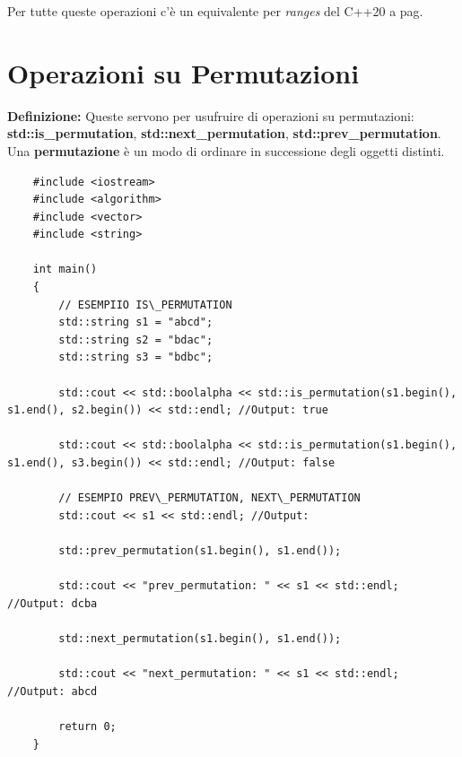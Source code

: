 
\fleuron

\textsf{\small Per tutte queste operazioni c'è un equivalente per \emph{ranges} del C++20 a pag. \pageref{ranges}} \\


\newpage

\section{Operazioni su Permutazioni}

\textsf{\small \textbf{Definizione: } Queste servono per usufruire di operazioni su permutazioni: \textbf{std::is\_permutation}, \textbf{std::next\_permutation}, \textbf{std::prev\_permutation}.} \\

\textsf{\small Una \textbf{permutazione} è un modo di ordinare in successione degli oggetti distinti.} \\

\begin{lstlisting}
	#include <iostream>
	#include <algorithm>
	#include <vector>
	#include <string>
	
	int main()
	{
		// ESEMPIIO IS\_PERMUTATION
		std::string s1 = "abcd";
		std::string s2 = "bdac";
		std::string s3 = "bdbc";
		
		std::cout << std::boolalpha << std::is_permutation(s1.begin(), s1.end(), s2.begin()) << std::endl; //Output: true
		
		std::cout << std::boolalpha << std::is_permutation(s1.begin(), s1.end(), s3.begin()) << std::endl; //Output: false
		
		// ESEMPIO PREV\_PERMUTATION, NEXT\_PERMUTATION
		std::cout << s1 << std::endl; //Output: 
		
		std::prev_permutation(s1.begin(), s1.end());
		
		std::cout << "prev_permutation: " << s1 << std::endl; //Output: dcba
		
		std::next_permutation(s1.begin(), s1.end());
		
		std::cout << "next_permutation: " << s1 << std::endl; //Output: abcd
		
		return 0;
	}
\end{lstlisting}

\fleuron

